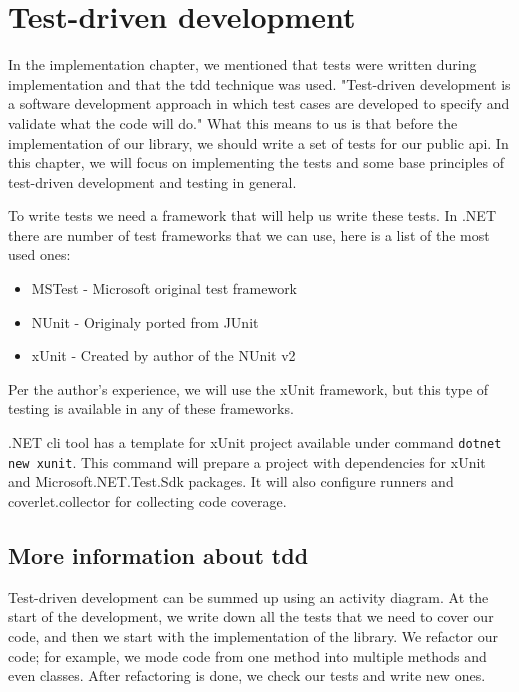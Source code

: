 \chapter {Test-driven development}

In the implementation chapter, we mentioned that tests were written during implementation and that the \acrshort{tdd} technique was used. "Test-driven development is a software development approach in which test cases are developed to specify
and validate what the code will do." \cite{hamilton_what_2020} What this means to us is that before the implementation of
our library, we should write a set of tests for our public \acrshort{api}. In this chapter, we will focus on implementing the tests
and some base principles of test-driven development and testing in general.

To write tests we need a framework that will help us write these tests. In .NET there are number of test frameworks that we can use, here is a list of
the most used ones:

\begin{itemize}
    \item {MSTest - Microsoft original test framework}
    \item {NUnit - Originaly ported from JUnit \cite{noauthor_nunitorg_nodate}}
    \item {xUnit - Created by author of the NUnit v2 \cite{noauthor_home_nodate}}
\end{itemize}

Per the author's experience, we will use the xUnit framework, but this type of testing is available in any of these frameworks.

.NET \acrshort{cli} tool has a template for xUnit project available under command \texttt{dotnet new xunit}. This command will
prepare a project with dependencies for xUnit and Microsoft.NET.Test.Sdk packages. It will also configure runners and coverlet.collector for collecting
code coverage.

\section{More information about \acrshort{tdd}}

Test-driven development can be summed up using an activity diagram. At the start of the development, we write down all the tests that we need to cover our code, and then we start with the implementation of the library. We refactor our code; for example, we mode code from one method into multiple methods and even classes.
After refactoring is done, we check our tests and write new ones.

